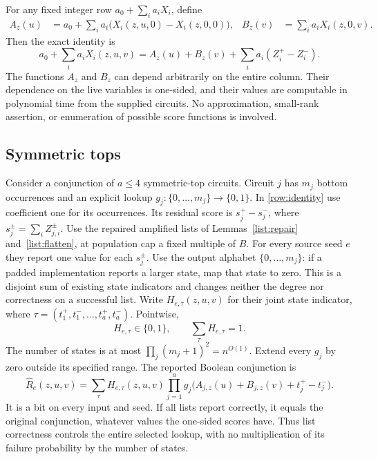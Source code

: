\documentclass[11pt,letterpaper]{article}
\theoremstyle{definition}
\theoremstyle{remark}
\begin{document}
For any fixed integer row $a_0+\sum_i a_iX_i$, define
\begin{align}
 A_z(u)&=a_0+\sum_i a_i\bigl(X_i(z,u,0)-X_i(z,0,0)\bigr),
 &B_z(v)&=\sum_i a_iX_i(z,0,v).
 \label{row:one-sided}
\end{align}
Then the exact identity is
\begin{equation}
 a_0+\sum_i a_iX_i(z,u,v)
 =A_z(u)+B_z(v)+\sum_i a_i(Z_i^+-Z_i^-).
 \label{row:identity}
\end{equation}
The functions $A_z$ and $B_z$ can depend arbitrarily on the entire
column.  Their dependence on the live variables is one-sided, and their
values are computable in polynomial time from the supplied circuits.
No approximation, small-rank assertion, or enumeration of possible
score functions is involved.

\subsection{Symmetric tops}

Consider a conjunction of $a\le4$ symmetric-top circuits.  Circuit $j$
has $m_j$ bottom occurrences and an explicit lookup
$g_j:\{0,\ldots,m_j\}\to\{0,1\}$.  In
\eqref{row:identity} use coefficient one for its occurrences.  Its
residual score is $s_j^+-s_j^-$, where $s_j^\pm=\sum_iZ_{j,i}^\pm$.
Use the repaired amplified lists of Lemmas~\ref{list:repair}
and~\ref{list:flatten}, at population cap a fixed multiple of $B$.
For every source seed $e$ they report one value for each $s_j^\pm$.
Use the output alphabet $\{0,\ldots,m_j\}$: if a padded implementation
reports a larger state, map that state to zero.  This is a disjoint
sum of existing state indicators and changes neither the degree nor
correctness on a successful list.
Write $H_{e,\tau}(z,u,v)$ for their joint state indicator, where
$\tau=(t_1^+,t_1^-,\ldots,t_a^+,t_a^-)$.  Pointwise,
\begin{equation}
 H_{e,\tau}\in\{0,1\},\qquad
 \sum_\tau H_{e,\tau}=1.
 \label{row:onehot-sym}
\end{equation}
The number of states is at most $\prod_j(m_j+1)^2=n^{O(1)}$.
Extend every $g_j$ by zero outside its specified range.  The reported
Boolean conjunction is
\begin{equation}
 \widehat R_e(z,u,v)=
 \sum_\tau H_{e,\tau}(z,u,v)
 \prod_{j=1}^a
 g_j\bigl(A_{j,z}(u)+B_{j,z}(v)+t_j^+-t_j^-\bigr).
 \label{row:sym-reported}
\end{equation}
It is a bit on every input and seed.  If all lists report correctly,
it equals the original conjunction, whatever values the one-sided
scores have.  Thus list correctness controls the entire selected
lookup, with no multiplication of its failure probability by the
number of states.
\end{document}
